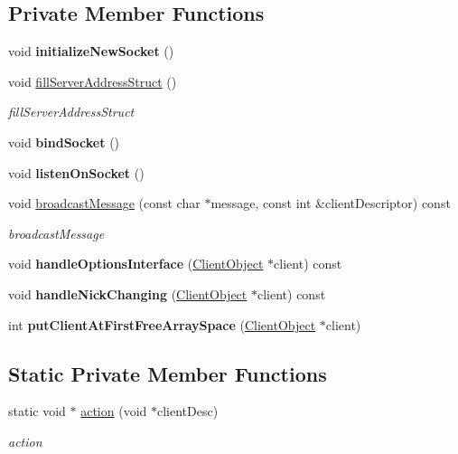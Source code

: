 \subsection*{Private Member Functions}
\begin{DoxyCompactItemize}
\item 
\mbox{\label{classServer_ac47f99e1f4ab05e3d67b213514caf748}} 
void {\bfseries initialize\+New\+Socket} ()
\item 
void \hyperlink{classServer_a684bf0fce1ec62711a60d0cc3d25e8f8}{fill\+Server\+Address\+Struct} ()
\begin{DoxyCompactList}\small\item\em fill\+Server\+Address\+Struct \end{DoxyCompactList}\item 
\mbox{\label{classServer_a8d86edf1df9f12df07dc6e949d70f77f}} 
void {\bfseries bind\+Socket} ()
\item 
\mbox{\label{classServer_ab021d8bdec2e65ef97537b9542e946a2}} 
void {\bfseries listen\+On\+Socket} ()
\item 
void \hyperlink{classServer_a7153ea97c1112ae9dc61c65dc59c7f82}{broadcast\+Message} (const char $\ast$message, const int \&client\+Descriptor) const
\begin{DoxyCompactList}\small\item\em broadcast\+Message \end{DoxyCompactList}\item 
\mbox{\label{classServer_a33f3480d7e4f8f44cb857ad6eaf2e076}} 
void {\bfseries handle\+Options\+Interface} (\hyperlink{classClientObject}{Client\+Object} $\ast$client) const
\item 
\mbox{\label{classServer_a84e4f16adced76015a29b34f42027d4f}} 
void {\bfseries handle\+Nick\+Changing} (\hyperlink{classClientObject}{Client\+Object} $\ast$client) const
\item 
\mbox{\label{classServer_abcb6a001f76580524bdd3b96998e964c}} 
int {\bfseries put\+Client\+At\+First\+Free\+Array\+Space} (\hyperlink{classClientObject}{Client\+Object} $\ast$client)
\end{DoxyCompactItemize}
\subsection*{Static Private Member Functions}
\begin{DoxyCompactItemize}
\item 
static void $\ast$ \hyperlink{classServer_a75b8fdcfd5e0438efe7bb79b317caa16}{action} (void $\ast$client\+Desc)
\begin{DoxyCompactList}\small\item\em action \end{DoxyCompactList}\end{DoxyCompactItemize}

